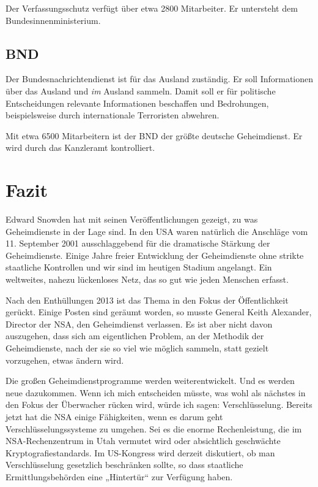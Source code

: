 \documentclass[12pt,a4paper]{scrartcl}
\begin{document}
Der Verfassungsschutz verfügt über etwa 2800 Mitarbeiter. Er untersteht dem Bundesinnenministerium.\cite{ard_geheimdienste}

\subsection{BND}
Der Bundesnachrichtendienst ist für das Ausland zuständig. Er soll Informationen über das Ausland und \emph{im} Ausland sammeln. Damit soll er für politische Entscheidungen relevante Informationen beschaffen und Bedrohungen, beispielsweise durch internationale Terroristen abwehren.\cite{ard_geheimdienste}

Mit etwa 6500 Mitarbeitern ist der BND der größte deutsche Geheimdienst. Er wird durch das Kanzleramt kontrolliert.\cite{ard_geheimdienste}

\section{Fazit}
Edward Snowden hat mit seinen Veröffentlichungen gezeigt, zu was Geheimdienste in der Lage sind. In den USA waren natürlich die Anschläge vom 11. September 2001 ausschlaggebend für die dramatische Stärkung der Geheimdienste. Einige Jahre freier Entwicklung der Geheimdienste ohne strikte staatliche Kontrollen und wir sind im heutigen Stadium angelangt. Ein weltweites, nahezu lückenloses Netz, das so gut wie jeden Menschen erfasst.

Nach den Enthüllungen 2013 ist das Thema in den Fokus der Öffentlichkeit gerückt. Einige Posten sind geräumt worden, so musste General Keith Alexander, Director der NSA, den Geheimdienst verlassen. Es ist aber nicht davon auszugehen, dass sich am eigentlichen Problem, an der Methodik der Geheimdienste, nach der sie so viel wie möglich sammeln, statt gezielt vorzugehen, etwas ändern wird.

Die großen Geheimdienstprogramme werden weiterentwickelt. Und es werden neue dazukommen. Wenn ich mich entscheiden müsste, was wohl als nächstes in den Fokus der Überwacher rücken wird, würde ich sagen: Verschlüsselung. Bereits jetzt hat die NSA einige Fähigkeiten, wenn es darum geht Verschlüsselungssysteme zu umgehen. Sei es die enorme Rechenleistung, die im NSA-Rechenzentrum in Utah vermutet wird oder absichtlich geschwächte Kryptografiestandards. Im US-Kongress wird derzeit diskutiert, ob man Verschlüsselung gesetzlich beschränken sollte, so dass staatliche Ermittlungsbehörden eine „Hintertür“ zur Verfügung haben.
\end{document}

